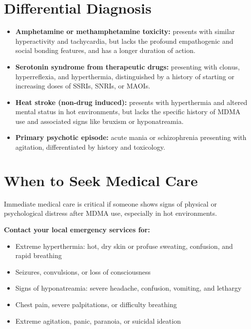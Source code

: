 \section*{Differential Diagnosis}
\begin{itemize}
    \item \textbf{Amphetamine or methamphetamine toxicity:} presents with similar hyperactivity and tachycardia, but lacks the profound empathogenic and social bonding features, and has a longer duration of action.
    \item \textbf{Serotonin syndrome from therapeutic drugs:} presenting with clonus, hyperreflexia, and hyperthermia, distinguished by a history of starting or increasing doses of SSRIs, SNRIs, or MAOIs.
    \item \textbf{Heat stroke (non-drug induced):} presents with hyperthermia and altered mental status in hot environments, but lacks the specific history of MDMA use and associated signs like bruxism or hyponatreamia.
    \item \textbf{Primary psychotic episode:} acute mania or schizophrenia presenting with agitation, differentiated by history and toxicology.
\end{itemize}

\section*{When to Seek Medical Care}
Immediate medical care is critical if someone shows signs of physical or psychological distress after MDMA use, especially in hot environments.

\textbf{Contact your local emergency services for:}
\begin{itemize}
    \item Extreme hyperthermia: hot, dry skin or profuse sweating, confusion, and rapid breathing
    \item Seizures, convulsions, or loss of consciousness
    \item Signs of hyponatreamia: severe headache, confusion, vomiting, and lethargy
    \item Chest pain, severe palpitations, or difficulty breathing
    \item Extreme agitation, panic, paranoia, or suicidal ideation
\end{itemize}

